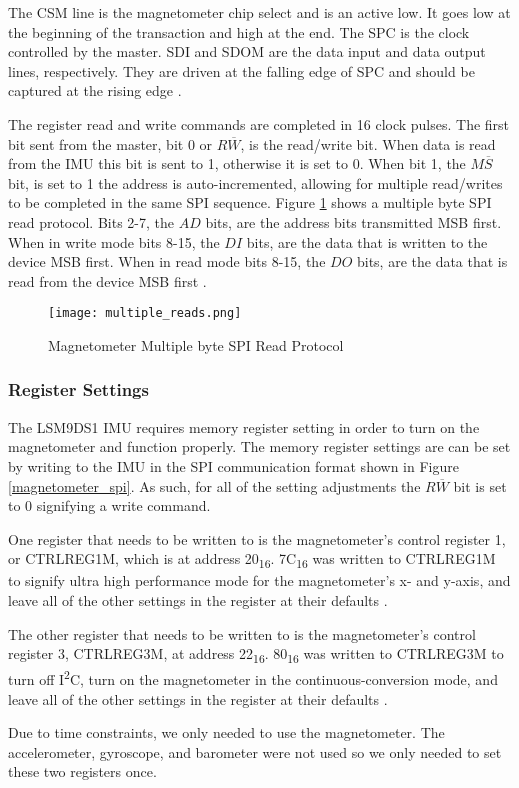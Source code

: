The CS\textunderscore{}M line is the magnetometer chip select and is an active low. It goes low at the beginning of the transaction and high at the end. The SPC is the clock controlled by the master. SDI and SDO\textunderscore{}M are the data input and data output lines, respectively. They are driven at the falling edge of SPC and should be captured at the rising edge \cite{lsm9ds1}.
\par
The register read and write commands are completed in 16 clock pulses. The first bit sent from the master, bit 0 or $R\overline{W}$, is the read/write bit. When data is read from the IMU this bit is sent to 1, otherwise it is set to 0. When bit 1, the $M\overline{S}$ bit, is set to 1 the address is auto-incremented, allowing for multiple read/writes to be completed in the same SPI sequence. Figure \ref{multiple_reads} shows a multiple byte SPI read protocol. Bits 2-7, the $AD$ bits, are the address bits transmitted MSB first. When in write mode bits 8-15, the $DI$ bits, are the data that is written to the device MSB first. When in read mode bits 8-15, the $DO$ bits, are the data that is read from the device MSB first \cite{lsm9ds1}.

\begin{figure}[H]
	\centerline{\texttt{[image: multiple\_reads.png]}}
	\caption{Magnetometer Multiple byte SPI Read Protocol \cite{lsm9ds1}}
	\label{multiple_reads}
\end{figure}

\subsubsection{Register Settings}
The LSM9DS1 IMU requires memory register setting in order to turn on the magnetometer and function properly. The memory register settings are can be set by writing to the IMU in the SPI communication format shown in Figure \ref{magnetometer_spi}. As such, for all of the setting adjustments the $R\overline{W}$ bit is set to 0 signifying a write command.
\par
One register that needs to be written to is the magnetometer's control register 1, or CTRL\textunderscore{}REG\textunderscore{}1\textunderscore{}M, which is at address 20\textsubscript{16}. 7C\textsubscript{16} was written to CTRL\textunderscore{}REG\textunderscore{}1\textunderscore{}M to signify ultra high performance mode for the magnetometer's x- and y-axis, and leave all of the other settings in the register at their defaults \cite{lsm9ds1}.
\par
The other register that needs to be written to is the magnetometer's control register 3, CTRL\textunderscore{}REG\textunderscore{}3\textunderscore{}M, at address 22\textsubscript{16}. 80\textsubscript{16} was written to CTRL\textunderscore{}REG\textunderscore{}3\textunderscore{}M to turn off I\textsuperscript{2}C, turn on the magnetometer in the continuous-conversion mode, and leave all of the other settings in the register at their defaults \cite{lsm9ds1}.
\par
Due to time constraints, we only needed to use the magnetometer. The accelerometer, gyroscope, and barometer were not used so we only needed to set these two registers once.


